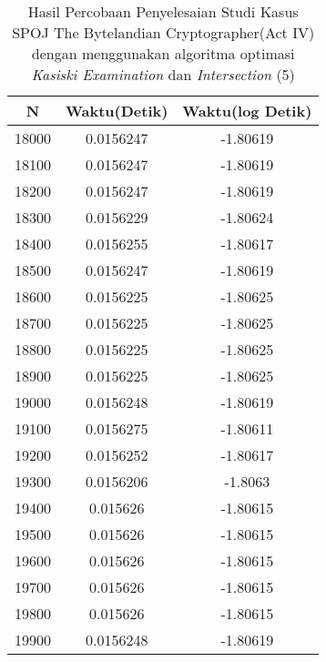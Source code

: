 \begin{table}[H]
\centering
\caption {Hasil Percobaan Penyelesaian Studi Kasus SPOJ The Bytelandian Cryptographer(Act IV) dengan menggunakan algoritma optimasi \textit{Kasiski Examination} dan \textit{Intersection} (5)}
\begin{tabular}{|c|c|c|}\hline
N&Waktu(Detik)&Waktu(log Detik)\\ \hline
18000&0.0156247&-1.80619\\ \hline
18100&0.0156247&-1.80619\\ \hline
18200&0.0156247&-1.80619\\ \hline
18300&0.0156229&-1.80624\\ \hline
18400&0.0156255&-1.80617\\ \hline
18500&0.0156247&-1.80619\\ \hline
18600&0.0156225&-1.80625\\ \hline
18700&0.0156225&-1.80625\\ \hline
18800&0.0156225&-1.80625\\ \hline
18900&0.0156225&-1.80625\\ \hline
19000&0.0156248&-1.80619\\ \hline
19100&0.0156275&-1.80611\\ \hline
19200&0.0156252&-1.80617\\ \hline
19300&0.0156206&-1.8063\\ \hline
19400&0.015626&-1.80615\\ \hline
19500&0.015626&-1.80615\\ \hline
19600&0.015626&-1.80615\\ \hline
19700&0.015626&-1.80615\\ \hline
19800&0.015626&-1.80615\\ \hline
19900&0.0156248&-1.80619\\ \hline
\end{tabular}
\label{tab:res11}
\end{table}


